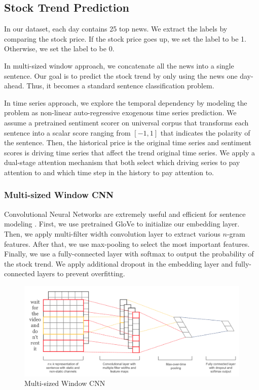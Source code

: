 \documentclass[11pt,a4paper]{article}
\begin{document}
\subsection{Stock Trend Prediction}
In our dataset, each day contains 25 top news. We extract the labels by comparing the stock price. If the stock price goes up, we set the label to be 1. Otherwise, we set the label to be 0.

In multi-sized window approach, we concatenate all the news into a single sentence. Our goal is to predict the stock trend by only using the news one day-ahead. Thus, it becomes a standard sentence classification problem.

In time series approach, we explore the temporal dependency by modeling the problem as non-linear auto-regressive exogenous time series prediction. We assume a pretrained sentiment scorer on universal corpus that transforms each sentence into a scalar score ranging from $[-1, 1]$ that indicates the polarity of the sentence. Then, the historical price is the original time series and sentiment scores is driving time series that affect the trend original time series. We apply a dual-stage attention mechanism that both select which driving series to pay attention to and which time step in the history to pay attention to.

\subsubsection{Multi-sized Window CNN}
Convolutional Neural Networks are extremely useful and efficient for sentence modeling \cite{kim_cnn_sentiment}. First, we use pretrained GloVe \cite{glove} to initialize our embedding layer. Then, we apply multi-filter width convolution layer to extract various $n$-gram features. After that, we use max-pooling to select the most important features. Finally, we use a fully-connected layer with softmax to output the probability of the stock trend. We apply additional dropout in the embedding layer and fully-connected layers to prevent overfitting.

\begin{figure}
  \centering
  \includegraphics[width=\linewidth]{multi-size-cnn}
  \caption{Multi-sized Window CNN}
  \label{fig:multi_size_cnn}
\end{figure}
\end{document}
